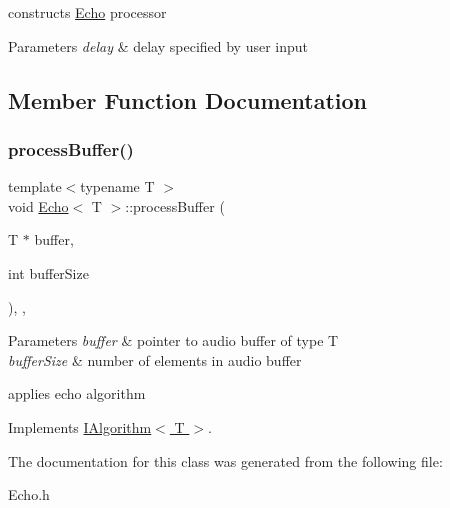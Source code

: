 constructs \hyperlink{classEcho}{Echo} processor 
\begin{DoxyParams}{Parameters}
{\em delay} & delay specified by user input \\
\hline
\end{DoxyParams}


\subsection{Member Function Documentation}
\mbox{\label{classEcho_af5ea3baaa51600cf111f21f931895b46}} 
\subsubsection{\texorpdfstring{process\+Buffer()}{processBuffer()}}
{\footnotesize\ttfamily template$<$typename T $>$ \\
void \hyperlink{classEcho}{Echo}$<$ T $>$\+::process\+Buffer (\begin{DoxyParamCaption}\item[{T $\ast$}]{buffer,  }\item[{int}]{buffer\+Size }\end{DoxyParamCaption})\hspace{0.3cm}{\ttfamily [inline]}, {\ttfamily [override]}, {\ttfamily [virtual]}}


\begin{DoxyParams}{Parameters}
{\em buffer} & pointer to audio buffer of type T \\
\hline
{\em buffer\+Size} & number of elements in audio buffer\\
\hline
\end{DoxyParams}
applies echo algorithm 

Implements \hyperlink{classIAlgorithm}{I\+Algorithm$<$ T $>$}.



The documentation for this class was generated from the following file\+:\begin{DoxyCompactItemize}
\item 
Echo.\+h\end{DoxyCompactItemize}
